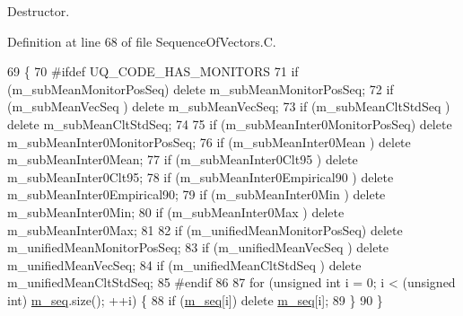 Destructor. 



Definition at line 68 of file Sequence\-Of\-Vectors.\-C.


\begin{DoxyCode}
69 \{
70 \textcolor{preprocessor}{#ifdef UQ\_CODE\_HAS\_MONITORS}
71 \textcolor{preprocessor}{}  \textcolor{keywordflow}{if} (m\_subMeanMonitorPosSeq) \textcolor{keyword}{delete} m\_subMeanMonitorPosSeq;
72   \textcolor{keywordflow}{if} (m\_subMeanVecSeq       ) \textcolor{keyword}{delete} m\_subMeanVecSeq;
73   \textcolor{keywordflow}{if} (m\_subMeanCltStdSeq    ) \textcolor{keyword}{delete} m\_subMeanCltStdSeq;
74 
75   \textcolor{keywordflow}{if} (m\_subMeanInter0MonitorPosSeq) \textcolor{keyword}{delete} m\_subMeanInter0MonitorPosSeq;
76   \textcolor{keywordflow}{if} (m\_subMeanInter0Mean         ) \textcolor{keyword}{delete} m\_subMeanInter0Mean;
77   \textcolor{keywordflow}{if} (m\_subMeanInter0Clt95        ) \textcolor{keyword}{delete} m\_subMeanInter0Clt95;
78   \textcolor{keywordflow}{if} (m\_subMeanInter0Empirical90  ) \textcolor{keyword}{delete} m\_subMeanInter0Empirical90;
79   \textcolor{keywordflow}{if} (m\_subMeanInter0Min          ) \textcolor{keyword}{delete} m\_subMeanInter0Min;
80   \textcolor{keywordflow}{if} (m\_subMeanInter0Max          ) \textcolor{keyword}{delete} m\_subMeanInter0Max;
81 
82   \textcolor{keywordflow}{if} (m\_unifiedMeanMonitorPosSeq) \textcolor{keyword}{delete} m\_unifiedMeanMonitorPosSeq;
83   \textcolor{keywordflow}{if} (m\_unifiedMeanVecSeq       ) \textcolor{keyword}{delete} m\_unifiedMeanVecSeq;
84   \textcolor{keywordflow}{if} (m\_unifiedMeanCltStdSeq    ) \textcolor{keyword}{delete} m\_unifiedMeanCltStdSeq;
85 \textcolor{preprocessor}{#endif}
86 \textcolor{preprocessor}{}
87   \textcolor{keywordflow}{for} (\textcolor{keywordtype}{unsigned} \textcolor{keywordtype}{int} i = 0; i < (\textcolor{keywordtype}{unsigned} int) \hyperlink{class_q_u_e_s_o_1_1_sequence_of_vectors_ae83e7c53439265667809256d0d302e5b}{m\_seq}.size(); ++i) \{
88     \textcolor{keywordflow}{if} (\hyperlink{class_q_u_e_s_o_1_1_sequence_of_vectors_ae83e7c53439265667809256d0d302e5b}{m\_seq}[i]) \textcolor{keyword}{delete} \hyperlink{class_q_u_e_s_o_1_1_sequence_of_vectors_ae83e7c53439265667809256d0d302e5b}{m\_seq}[i];
89   \}
90 \}
\end{DoxyCode}


